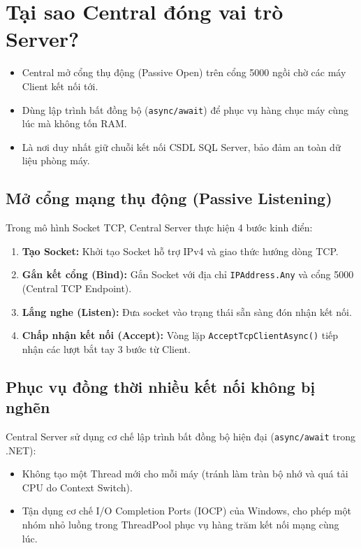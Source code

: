 \documentclass[12pt,a4paper]{article}
\begin{document}
\section{Tại sao Central đóng vai trò Server?}

\begin{summarybox}
\begin{itemize}[leftmargin=1.5em, itemsep=1pt]
  \item Central mở cổng thụ động (Passive Open) trên cổng 5000 ngồi chờ các máy Client kết nối tới.
  \item Dùng lập trình bất đồng bộ (\texttt{async/await}) để phục vụ hàng chục máy cùng lúc mà không tốn RAM.
  \item Là nơi duy nhất giữ chuỗi kết nối CSDL SQL Server, bảo đảm an toàn dữ liệu phòng máy.
\end{itemize}
\end{summarybox}

\subsection{Mở cổng mạng thụ động (Passive Listening)}
Trong mô hình Socket TCP, Central Server thực hiện 4 bước kinh điển:
\begin{enumerate}
  \item \textbf{Tạo Socket:} Khởi tạo Socket hỗ trợ IPv4 và giao thức hướng dòng TCP.
  \item \textbf{Gắn kết cổng (Bind):} Gắn Socket với địa chỉ \texttt{IPAddress.Any} và cổng 5000 (Central TCP Endpoint).
  \item \textbf{Lắng nghe (Listen):} Đưa socket vào trạng thái sẵn sàng đón nhận kết nối.
  \item \textbf{Chấp nhận kết nối (Accept):} Vòng lặp \texttt{AcceptTcpClientAsync()} tiếp nhận các lượt bắt tay 3 bước từ Client.
\end{enumerate}

\subsection{Phục vụ đồng thời nhiều kết nối không bị nghẽn}
Central Server sử dụng cơ chế lập trình bất đồng bộ hiện đại (\texttt{async/await} trong .NET):
\begin{itemize}
  \item Không tạo một Thread mới cho mỗi máy (tránh làm tràn bộ nhớ và quá tải CPU do Context Switch).
  \item Tận dụng cơ chế I/O Completion Ports (IOCP) của Windows, cho phép một nhóm nhỏ luồng trong ThreadPool phục vụ hàng trăm kết nối mạng cùng lúc.
\end{itemize}
\end{document}
